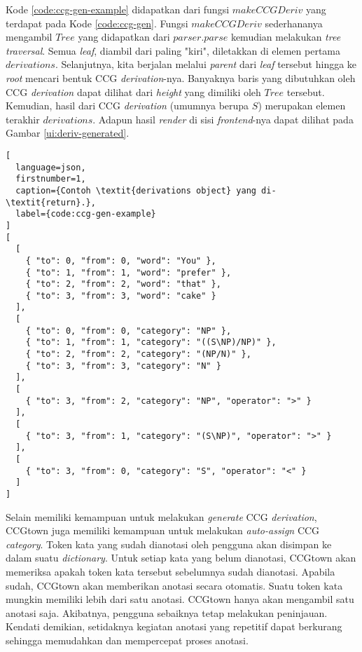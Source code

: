 Kode \ref{code:ccg-gen-example} didapatkan dari fungsi $makeCCGDeriv$ yang terdapat pada
Kode \ref{code:ccg-gen}. Fungsi $makeCCGDeriv$ sederhananya mengambil $Tree$ yang didapatkan
dari $parser.parse$ kemudian melakukan \textit{tree traversal}. Semua \textit{leaf}, diambil
dari paling "kiri", diletakkan di elemen pertama $derivations$. Selanjutnya, kita berjalan
melalui \textit{parent} dari \textit{leaf} tersebut hingga ke \textit{root} mencari bentuk CCG
\textit{derivation}-nya. Banyaknya baris yang dibutuhkan oleh CCG \textit{derivation} dapat
dilihat dari \textit{height} yang dimiliki oleh $Tree$ tersebut. Kemudian, hasil dari CCG
\textit{derivation} (umumnya berupa $S$) merupakan elemen terakhir $derivations$.
Adapun hasil \textit{render} di sisi \textit{frontend}-nya dapat dilihat pada Gambar
\ref{ui:deriv-generated}.

\begin{lstlisting}[
  language=json,
  firstnumber=1,
  caption={Contoh \textit{derivations object} yang di-\textit{return}.},
  label={code:ccg-gen-example}
]
[
  [
    { "to": 0, "from": 0, "word": "You" },
    { "to": 1, "from": 1, "word": "prefer" },
    { "to": 2, "from": 2, "word": "that" },
    { "to": 3, "from": 3, "word": "cake" }
  ],
  [
    { "to": 0, "from": 0, "category": "NP" },
    { "to": 1, "from": 1, "category": "((S\NP)/NP)" },
    { "to": 2, "from": 2, "category": "(NP/N)" },
    { "to": 3, "from": 3, "category": "N" }
  ],
  [
    { "to": 3, "from": 2, "category": "NP", "operator": ">" }
  ],
  [
    { "to": 3, "from": 1, "category": "(S\NP)", "operator": ">" }
  ],
  [
    { "to": 3, "from": 0, "category": "S", "operator": "<" }
  ]
]
\end{lstlisting}

Selain memiliki kemampuan untuk melakukan \textit{generate} CCG \textit{derivation},
CCGtown juga memiliki kemampuan untuk melakukan \textit{auto-assign} CCG \textit{category}.
Token kata yang sudah dianotasi oleh pengguna akan disimpan ke dalam suatu \textit{dictionary}.
Untuk setiap kata yang belum dianotasi, CCGtown akan memeriksa apakah token kata tersebut
sebelumnya sudah dianotasi. Apabila sudah, CCGtown akan memberikan anotasi secara otomatis.
Suatu token kata mungkin memiliki lebih dari satu anotasi. CCGtown hanya akan mengambil satu
anotasi saja. Akibatnya, pengguna sebaiknya tetap melakukan peninjauan.
Kendati demikian, setidaknya kegiatan anotasi yang repetitif dapat berkurang sehingga memudahkan
dan mempercepat proses anotasi.



